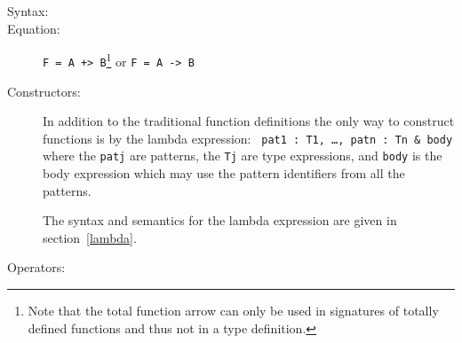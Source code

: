 \documentclass[\pformat,12pt]{article}
\begin{document}

\begin{description}
\item[Syntax:]
  

  
  
  
\item[Equation:] {\tt F = A +> B}\footnote{Note that the total
function arrow can only be used in signatures of totally defined
functions and thus not in a type definition.} or {\tt F = A -> B}%
\index{\texttt{->}}\index{\texttt{+>}}

\item[Constructors:] In addition to the traditional function
  definitions the only way to construct functions is by the lambda
  expression: {\tt {} pat1 : T1, \ldots, patn : Tn \& body}
  where the {\tt patj} are patterns, the {\tt Tj} are type expressions, and
  {\tt body} is the body expression which may use the pattern
  identifiers from all the patterns.

  The syntax and semantics for the lambda expression are given in
  section~\ref{lambda}.
\item[Operators:] \mbox{}


\end{description}
\end{document}
